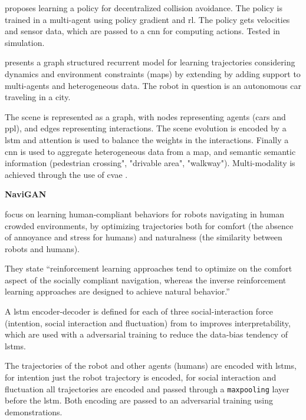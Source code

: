 \cite{long2018towards} proposes learning a policy for decentralized collision avoidance.
%
The policy is trained in a multi-agent  using policy gradient and \gls{rl}.
%
The policy gets velocities and sensor data, which are passed to a \gls{cnn} for computing actions.
%
Tested in simulation.
%


\cite{salzmann2020trajectron++}  presents a graph structured recurrent model for learning trajectories considering dynamics and environment constraints (maps) by extending \cite{ivanovic2019trajectron} by adding support to multi-agents and heterogeneous data. The robot in question is an autonomous car traveling in a city.  

The scene is represented as a graph, with nodes representing agents (cars and ppl), and edges representing interactions.
%
The scene evolution is encoded by a \gls{lstm} and attention is used to balance the weights in the interactions.
%
Finally a \gls{cnn} is used to aggregate heterogeneous data from a map, and semantic semantic information (pedestrian crossing", "drivable area", "walkway"). 
%
Multi-modality is achieved through the use of \gls{cvae} .


\textbf{NaviGAN}

\cite{tsai2020generative} focus on learning human-compliant behaviors for robots navigating in human crowded environments, by optimizing trajectories both for comfort (the absence of annoyance and stress for humans) and naturalness (the similarity between robots and humans).

They state ``reinforcement learning approaches tend to optimize on the comfort aspect of the socially compliant navigation, whereas the inverse reinforcement learning approaches are designed to achieve natural behavior.''

A \gls{lstm} encoder-decoder is defined for each of three social-interaction force (intention, social interaction and fluctuation) from \cite{helbing1995social} to improves interpretability, which are used with a adversarial training to reduce the data-bias tendency of \glspl{lstm}.

The trajectories of the robot and other agents (humans) are encoded with \glspl{lstm}, for intention just the robot trajectory is encoded, for social interaction and fluctuation all trajectories are encoded and passed through a \texttt{maxpooling} layer before the \gls{lstm}.
%
Both encoding are passed to an adversarial training using demonstrations.


